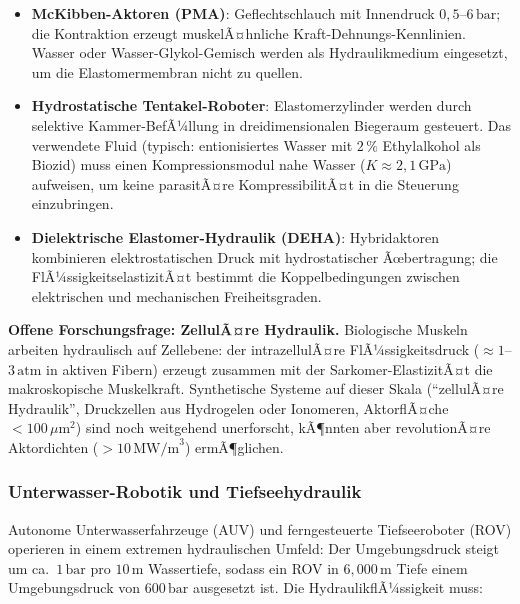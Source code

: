 ﻿\documentclass[a4paper,12pt]{scrreprt}
\theoremstyle{definition}
\begin{document}
\begin{itemize}
  \item \textbf{McKibben-Aktoren (PMA)}: Geflechtschlauch mit
    Innendruck $0{,}5$--$6\,\mathrm{bar}$; die Kontraktion erzeugt
    muskelÃ¤hnliche Kraft-Dehnungs-Kennlinien. Wasser oder
    Wasser-Glykol-Gemisch werden als Hydraulikmedium eingesetzt,
    um die Elastomermembran nicht zu quellen.
  \item \textbf{Hydrostatische Tentakel-Roboter}: Elastomerzylinder
    werden durch selektive Kammer-BefÃ¼llung in dreidimensionalen
    Biegeraum gesteuert. Das verwendete Fluid (typisch:
    entionisiertes Wasser mit $2\,\%$ Ethylalkohol als Biozid)
    muss einen Kompressionsmodul nahe Wasser ($K \approx 2{,}1\,\mathrm{GPa}$)
    aufweisen, um keine parasitÃ¤re KompressibilitÃ¤t in die Steuerung
    einzubringen.
  \item \textbf{Dielektrische Elastomer-Hydraulik (DEHA)}: Hybridaktoren
    kombinieren elektrostatischen Druck mit hydrostatischer Ãœbertragung;
    die FlÃ¼ssigkeitselastizitÃ¤t bestimmt die Koppelbedingungen zwischen
    elektrischen und mechanischen Freiheitsgraden.
\end{itemize}

\begin{infobox}
\textbf{Offene Forschungsfrage: ZellulÃ¤re Hydraulik.}
Biologische Muskeln arbeiten hydraulisch auf Zellebene: der intrazellulÃ¤re
FlÃ¼ssigkeitsdruck ($\approx 1$--$3\,\mathrm{atm}$ in aktiven Fibern)
erzeugt zusammen mit der Sarkomer-ElastizitÃ¤t die makroskopische
Muskelkraft. Synthetische Systeme auf dieser Skala (``zellulÃ¤re
Hydraulik'', Druckzellen aus Hydrogelen oder Ionomeren,
AktorflÃ¤che $< 100\,\mu\mathrm{m}^2$) sind noch weitgehend
unerforscht, kÃ¶nnten aber revolutionÃ¤re Aktordichten
($> 10\,\mathrm{MW/m}^3$) ermÃ¶glichen.
\end{infobox}

\subsubsection{Unterwasser-Robotik und Tiefseehydraulik}

Autonome Unterwasserfahrzeuge (AUV) und ferngesteuerte Tiefseeroboter
(ROV) operieren in einem extremen hydraulischen Umfeld: Der
Umgebungsdruck steigt um ca.\ $1\,\mathrm{bar}$ pro $10\,\mathrm{m}$
Wassertiefe, sodass ein ROV in $6{,}000\,\mathrm{m}$ Tiefe einem
Umgebungsdruck von $600\,\mathrm{bar}$ ausgesetzt ist. Die
HydraulikflÃ¼ssigkeit muss:
\end{document}
